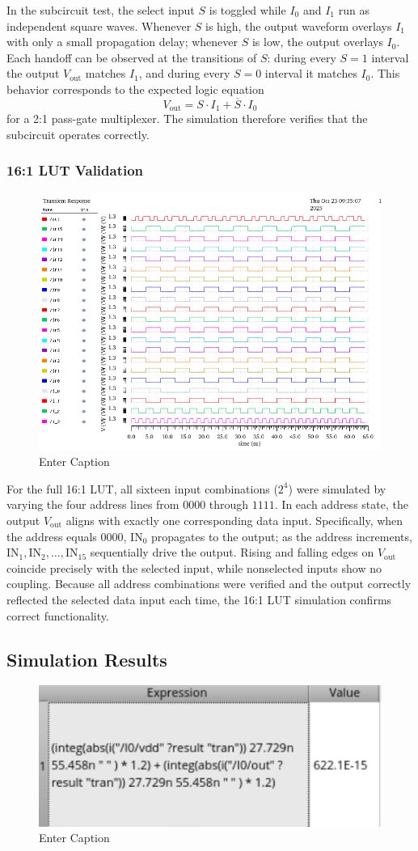 \documentclass[12pt]{article}
\begin{document}
In the subcircuit test, the select input \( S \) is toggled while \( I_0 \) and \( I_1 \) run as independent square waves. 
Whenever \( S \) is high, the output waveform overlays \( I_1 \) with only a small propagation delay; whenever \( S \) is low, the output overlays \( I_0 \). 
Each handoff can be observed at the transitions of \( S \): during every \( S=1 \) interval the output \( V_{\text{out}} \) matches \( I_1 \), and during every \( S=0 \) interval it matches \( I_0 \). 
This behavior corresponds to the expected logic equation 
\[
V_{\text{out}} = S \cdot I_1 + \overline{S} \cdot I_0
\]
for a 2:1 pass-gate multiplexer. 
The simulation therefore verifies that the subcircuit operates correctly.

\subsubsection*{16:1 LUT Validation}
\begin{figure}[H]
    \centering
    \includegraphics[width=0.5\linewidth]{writeup//figures/lutval.png}
    \caption{Enter Caption}
\end{figure}

For the full 16:1 LUT, all sixteen input combinations (\(2^4\)) were simulated by varying the four address lines from \(0000\) through \(1111\). 
In each address state, the output \(V_{\text{out}}\) aligns with exactly one corresponding data input. 
Specifically, when the address equals \(0000\), \(\text{IN}_0\) propagates to the output; as the address increments, \(\text{IN}_1, \text{IN}_2, \ldots, \text{IN}_{15}\) sequentially drive the output. 
Rising and falling edges on \(V_{\text{out}}\) coincide precisely with the selected input, while nonselected inputs show no coupling. 
Because all address combinations were verified and the output correctly reflected the selected data input each time, the 16:1 LUT simulation confirms correct functionality.


\newpage

\subsection{Simulation Results}
\begin{figure}[H]
    \centering
    \includegraphics[width=0.5\linewidth]{writeup//figures/baseline_energy_val.png}
    \caption{Enter Caption}
\end{figure}
\end{document}
